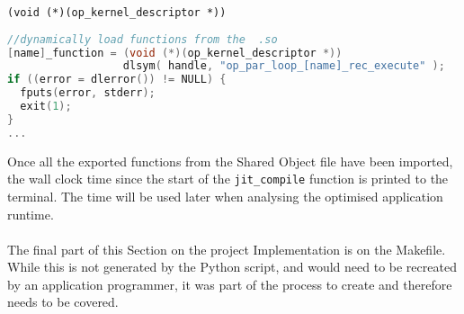 \verb|(void (*)(op_kernel_descriptor *))|
\vspace{1em}
\begin{lstlisting}[backgroundcolor=\color{red!20}, language=C]
//dynamically load functions from the  .so
[name]_function = (void (*)(op_kernel_descriptor *))
                  dlsym( handle, "op_par_loop_[name]_rec_execute" );
if ((error = dlerror()) != NULL) {
  fputs(error, stderr);
  exit(1);
}
...
\end{lstlisting}
\par
\noindent Once all the exported functions from the Shared Object file have been imported, the wall clock time since the start of the \verb|jit_compile| function is printed to the terminal. The time will be used later when analysing the optimised application runtime.\\
\\
The final part of this Section on the project Implementation is on the Makefile. While this is not generated by the Python script, and would need to be recreated by an application programmer, it was part of the process to create and therefore needs to be covered.

